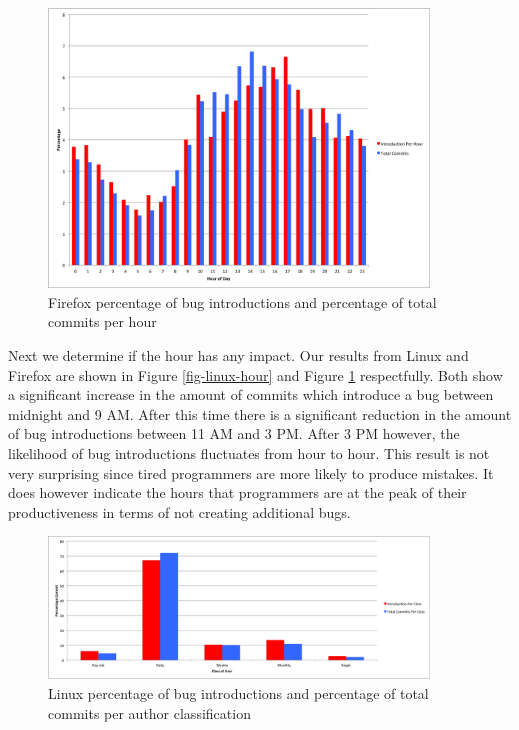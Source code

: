 \begin{figure}
\begin{center}
\includegraphics[width=0.9\textwidth]{firefox_hour_of_day.png}
\end{center}
\caption{Firefox percentage of bug introductions and percentage of total commits per hour}
\label{fig-firefox-hour}
\end{figure}

Next we determine if the hour has any impact. Our results from Linux
and Firefox are shown in Figure \ref{fig-linux-hour} and Figure
\ref{fig-firefox-hour} respectfully. Both show a significant increase
in the amount of commits which introduce a bug between midnight and 9
AM. After this time there is a significant reduction in the amount of
bug introductions between 11 AM and 3 PM. After 3 PM however, the
likelihood of bug introductions fluctuates from hour to hour. This
result is not very surprising since tired programmers are more likely to
produce mistakes. It does however indicate the hours that programmers
are at the peak of their productiveness in terms of not creating
additional bugs.

\begin{figure}
\begin{center}
\includegraphics[width=0.9\textwidth]{linux_per_class.png}
\end{center}
\caption{Linux percentage of bug introductions and percentage of total commits per author classification}
\label{fig-linux-class}
\end{figure}

